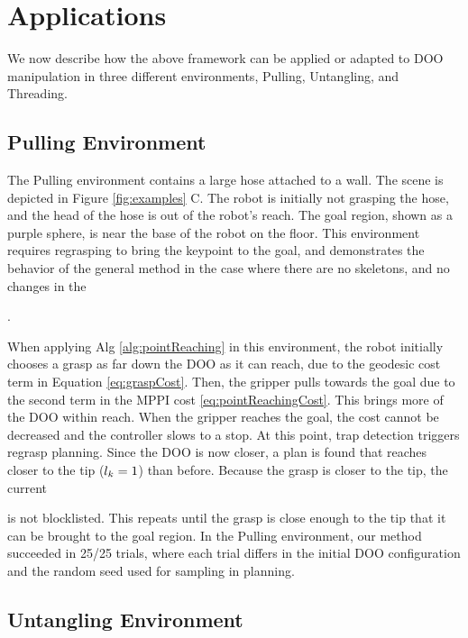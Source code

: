 \section{Applications}

We now describe how the above framework can be applied or adapted to DOO manipulation in three different environments, Pulling, Untangling, and Threading.

\subsection{Pulling Environment}

The Pulling environment contains a large hose attached to a wall. The scene is depicted in Figure \ref{fig:examples} C. The robot is initially not grasping the hose, and the head of the hose is out of the robot's reach. The goal region, shown as a purple sphere, is near the base of the robot on the floor. This environment requires regrasping to bring the keypoint to the goal, and demonstrates the behavior of the general method in the case where there are no skeletons, and no changes in the \signature{}.

When applying Alg \ref{alg:pointReaching} in this environment, the robot initially chooses a grasp as far down the DOO as it can reach, due to the geodesic cost term in Equation \ref{eq:graspCost}. Then, the gripper pulls towards the goal due to the second term in the MPPI cost \eqref{eq:pointReachingCost}. This brings more of the DOO within reach. When the gripper reaches the goal, the cost cannot be decreased and the controller slows to a stop. At this point, trap detection triggers regrasp planning. Since the DOO is now closer, a plan is found that reaches closer to the tip ($l_k=1$) than before. Because the grasp is closer to the tip, the current \signature{} is not blocklisted. This repeats until the grasp is close enough to the tip that it can be brought to the goal region. In the Pulling environment, our method succeeded in 25/25 trials, where each trial differs in the initial DOO configuration and the random seed used for sampling in planning.

\subsection{Untangling Environment}

